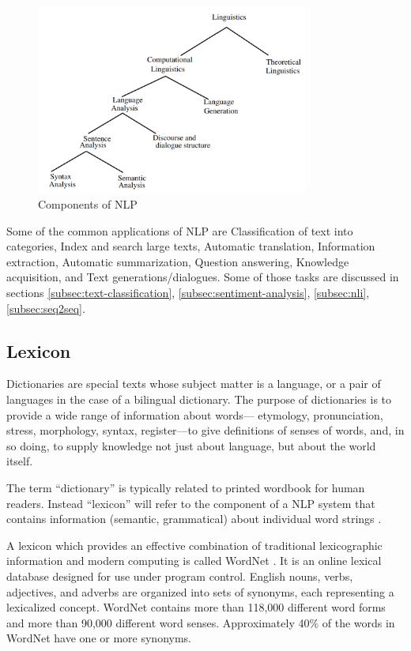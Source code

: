 \begin{figure}[H]
    \centering
    \includegraphics[width=0.8\textwidth]{images/2_1_nlp_components.png}
    \caption{Components of NLP}\label{fig:nlp_components}
\end{figure}
    

Some of the common applications of NLP are Classification of text into categories, Index and search large texts, Automatic translation, Information extraction,
Automatic summarization, Question answering, Knowledge acquisition, and Text
generations/dialogues.
Some of those tasks are discussed in sections \ref{subsec:text-classification}, \ref{subsec:sentiment-analysis}, \ref{subsec:nli}, \ref{subsec:seq2seq}.


\subsection{Lexicon}\label{subsec:lexicon}
Dictionaries are special texts whose subject matter is
a language, or a pair of languages in the case of a
bilingual dictionary. The purpose of dictionaries is to
provide a wide range of information about words---
etymology, pronunciation, stress, morphology, syntax, register---to give definitions of senses of words,
and, in so doing, to supply knowledge not just about
language, but about the world itself.

The term “dictionary” is typically related to printed wordbook for human readers. 
Instead “\gls{lexicon}” will refer to the component of
a NLP system that contains information (semantic,
grammatical) about individual word strings \cite{Guthrie_ComACM96}.

A lexicon which provides an effective combination of traditional
lexicographic information and modern computing is called WordNet \cite{miller1995wordnet}.
It is an online lexical database designed for use under program control. English nouns, verbs,
adjectives, and adverbs are organized into sets of synonyms, each representing
a lexicalized concept. WordNet contains more than 118,000 different word
forms and more than 90,000 different word senses. Approximately 40\% of
the words in WordNet have one or more synonyms.

